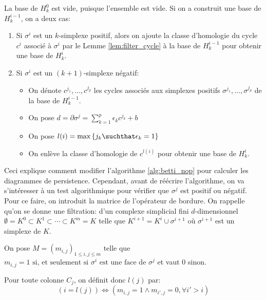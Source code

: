La base de $H_{k}^{0}$ est vide, puisque l'ensemble est vide.
Si on a construit une base de $H_{k}^{i - 1}$, on a deux cas:
\begin{enumerate}
	\item Si $\sigma^{i}$ est un $k$-simplexe positif, alors on ajoute la classe d'homologie du cycle
	      $c^{i}$ associé à $\sigma^{i}$ par le Lemme \ref{lem:filter_cycle} à la base de
	      $H_{k}^{i - 1}$ pour obtenir une base de $H_{k}^{i}$.
	\item Si $\sigma^{i}$ est un $(k + 1)$-simplexe négatif:
	      \begin{itemize}
		      \item On dénote $c^{j_{1}}, \ldots, c^{j_{p}}$ les cycles associés aux simplexes
		            positifs $\sigma^{j_{1}}, \ldots, \sigma^{j_{p}}$ de la base de $H_{k}^{i - 1}$.
		      \item On pose $d = \partial \sigma^{j} = \sum_{k = 1}^{p}\epsilon_{k}c^{j_{k}} + b$
		      \item On pose $l(i) = \max \left\{j_{k} \suchthat \epsilon_{k} = 1\right\}$
		      \item On enlève la classe d'homologie de $c^{l(i)}$ pour obtenir une base de $H_{k}^{i}$.
	      \end{itemize}
\end{enumerate}

Ceci explique comment modifier l'algorithme \ref{alg:betti_nop} pour calculer les diagrammes de persistence.
Cependant, avant de réécrire l'algorithme, on va s'intéresser à un test algorithmique pour vérifier que $\sigma^{j}$ est positif ou négatif.
Pour ce faire, on introduit la matrice de l'opérateur de bordure. On rappelle qu'on se donne une filtration:
d'un complexe simplicial fini $d$-dimensionnel
$\emptyset = K^{0} \subset K^{1} \subset \cdots \subset K^{m} = K$ telle que
$K^{i + 1} = K^{i} \cup \sigma^{i + 1}$ où $\sigma^{i + 1}$ est un simplexe de $K$.

\begin{definition}
	On pose $M = \left(m_{i, j}\right)_{1\leq i, j \leq m}$ telle que $m_{i, j} = 1 \text{ si, et seulement si } \sigma^{i} \text{ est une face de } \sigma^{j}$ et vaut $0$ sinon.
\end{definition}
Pour toute colonne $C_{j}$, on définit donc $l(j)$ par:
\begin{equation*}
	(i = l(j)) \Leftrightarrow (m_{i, j} = 1 \land m_{i', j} = 0, \forall i' > i)
\end{equation*}


